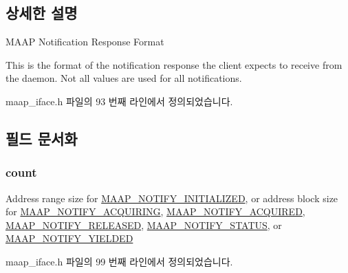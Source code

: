 \subsection{상세한 설명}
M\+A\+AP Notification Response Format

This is the format of the notification response the client expects to receive from the daemon. Not all values are used for all notifications. 

maap\+\_\+iface.\+h 파일의 93 번째 라인에서 정의되었습니다.



\subsection{필드 문서화}
\subsubsection[{\texorpdfstring{count}{count}}]{ count}\hypertarget{struct_maap___notify_a86988a65e0d3ece7990c032c159786d6}{}\label{struct_maap___notify_a86988a65e0d3ece7990c032c159786d6}
Address range size for \hyperlink{maap__iface_8h_a0d45e125fb876b383321d96bc510285ea1933d7302204862df14f845d2566183c}{M\+A\+A\+P\+\_\+\+N\+O\+T\+I\+F\+Y\+\_\+\+I\+N\+I\+T\+I\+A\+L\+I\+Z\+ED}, or address block size for \hyperlink{maap__iface_8h_a0d45e125fb876b383321d96bc510285ea0f5d99d0f124fe7233cacefd53f26127}{M\+A\+A\+P\+\_\+\+N\+O\+T\+I\+F\+Y\+\_\+\+A\+C\+Q\+U\+I\+R\+I\+NG}, \hyperlink{maap__iface_8h_a0d45e125fb876b383321d96bc510285ea37a35b37b6f804ebc82248ae3ed110c6}{M\+A\+A\+P\+\_\+\+N\+O\+T\+I\+F\+Y\+\_\+\+A\+C\+Q\+U\+I\+R\+ED}, \hyperlink{maap__iface_8h_a0d45e125fb876b383321d96bc510285eadcdf0612242dddc5976bc7eb80ae8813}{M\+A\+A\+P\+\_\+\+N\+O\+T\+I\+F\+Y\+\_\+\+R\+E\+L\+E\+A\+S\+ED}, \hyperlink{maap__iface_8h_a0d45e125fb876b383321d96bc510285ea993b057f5516f007248e70006319c846}{M\+A\+A\+P\+\_\+\+N\+O\+T\+I\+F\+Y\+\_\+\+S\+T\+A\+T\+US}, or \hyperlink{maap__iface_8h_a0d45e125fb876b383321d96bc510285ea438f0d11e6e3a74550cab4c378f9aeba}{M\+A\+A\+P\+\_\+\+N\+O\+T\+I\+F\+Y\+\_\+\+Y\+I\+E\+L\+D\+ED} 

maap\+\_\+iface.\+h 파일의 99 번째 라인에서 정의되었습니다.

